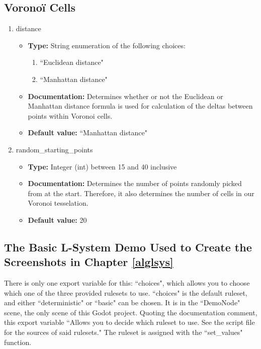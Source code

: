 \subsection{Voronoï Cells}

\begin{enumerate}
    \item distance
    \begin{itemize}
        \item \textbf{Type:} String enumeration of the following choices:
        \begin{enumerate}
            \item ``Euclidean distance"
            \item ``Manhattan distance"
        \end{enumerate}
        \item \textbf{Documentation:} Determines whether or not the Euclidean or Manhattan distance formula is used for calculation of the deltas between points within Voronoi cells.
        \item \textbf{Default value:} ``Manhattan distance"
    \end{itemize}
    \item random\_starting\_points
    \begin{itemize}
        \item \textbf{Type:} Integer (int) between 15 and 40 inclusive
        \item \textbf{Documentation:} Determines the number of points randomly picked from at the start. Therefore, it also determines the number of cells in our Voronoi tesselation.
        \item \textbf{Default value:} 20
    \end{itemize}
\end{enumerate}

\subsection{The Basic L-System Demo Used to Create the Screenshots in Chapter \ref{alglsys}}

There is only one export variable for this: ``choices", which allows you to choose which one of the three provided rulesets to use. ``choices" is the default ruleset, and either ``deterministic" or ``basic" can be chosen. It is in the ``DemoNode" scene, the only scene of this Godot project. Quoting the documentation comment, this export variable ``Allows you to decide which ruleset to use. See the script file for the sources of said rulesets." The ruleset is assigned with the ``set\_values" function.

